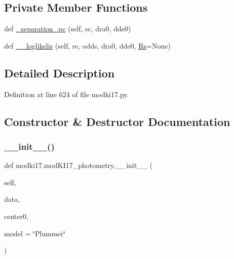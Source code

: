 \subsection*{Private Member Functions}
\begin{DoxyCompactItemize}
\item 
def \hyperlink{classmodki17_1_1modKI17__photometry_af64d278fc0d7f4161dd13abf005ce8c8}{\+\_\+separation\+\_\+pc} (self, sc, dra0, dde0)
\item 
def \hyperlink{classmodki17_1_1modKI17__photometry_a8e4f0338eabca2c723b6cf4148dec7a7}{\+\_\+\+\_\+loglikelis} (self, re, odds, dra0, dde0, \hyperlink{classmodki17_1_1modKI17__photometry_aebe66d2f7557c9143c8d636468400837}{Rs}=None)
\end{DoxyCompactItemize}


\subsection{Detailed Description}


Definition at line 624 of file modki17.\+py.



\subsection{Constructor \& Destructor Documentation}
\mbox{\label{classmodki17_1_1modKI17__photometry_ac6b74b27fd17bb8e7353d00bfd007ec1}} 
\subsubsection{\texorpdfstring{\+\_\+\+\_\+init\+\_\+\+\_\+()}{\_\_init\_\_()}}
{\footnotesize\ttfamily def modki17.\+mod\+K\+I17\+\_\+photometry.\+\_\+\+\_\+init\+\_\+\+\_\+ (\begin{DoxyParamCaption}\item[{}]{self,  }\item[{}]{data,  }\item[{}]{center0,  }\item[{}]{model = {\ttfamily \char`\"{}Plummer\char`\"{}} }\end{DoxyParamCaption})}

